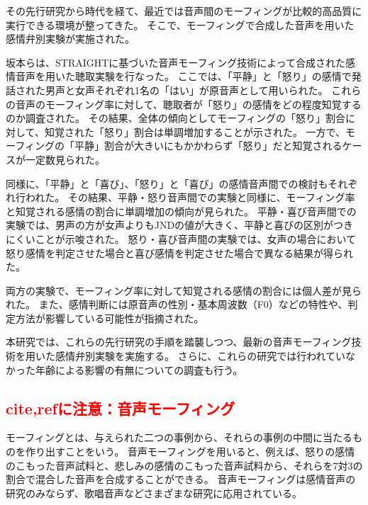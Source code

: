その先行研究\cite{laukka2005categorical}から時代を経て、最近では音声間のモーフィングが比較的高品質に実行できる環境が整ってきた\cite{matsui2003STRAIGHT,kawahara2024interactive}。
そこで、モーフィングで合成した音声を用いた感情弁別実験が実施された。

坂本らは、STRAIGHTに基づいた音声モーフィング技術\cite{matsui2003STRAIGHT}によって合成された感情音声を用いた聴取実験を行なった\cite{sakamoto2020morphEmo}。
ここでは、「平静」と「怒り」の感情で発話された男声と女声それぞれ1名の「はい」が原音声として用いられた。
これらの音声のモーフィング率に対して、聴取者が「怒り」の感情をどの程度知覚するのか調査された。
その結果、全体の傾向としてモーフィングの「怒り」割合に対して、知覚された「怒り」割合は単調増加することが示された。
一方で、モーフィングの「平静」割合が大きいにもかかわらず「怒り」だと知覚されるケースが一定数見られた。

同様に、「平静」と「喜び」、「怒り」と「喜び」の感情音声間での検討もそれぞれ行われた\cite{sakamoto2021morphEmo}。
その結果、平静・怒り音声間での実験と同様に、モーフィング率と知覚される感情の割合に単調増加の傾向が見られた。
平静・喜び音声間での実験では、男声の方が女声よりもJNDの値が大きく、平静と喜びの区別がつきにくいことが示唆された。
怒り・喜び音声間の実験では、女声の場合において怒り感情を判定させた場合と喜び感情を判定させた場合で異なる結果が得られた。

両方の実験で、モーフィング率に対して知覚される感情の割合には個人差が見られた。
また、感情判断には原音声の性別・基本周波数（F0）などの特性や、判定方法が影響している可能性が指摘された。

本研究では、これらの先行研究の手順を踏襲しつつ、最新の音声モーフィング技術\cite{kawahara2024interactive}を用いた感情弁別実験を実施する。
さらに、これらの研究では行われていなかった年齢による影響の有無についての調査も行う。



\subsection{\textcolor{red}{cite,refに注意：音声モーフィング}}
\label{sec:morphing}
モーフィングとは、与えられた二つの事例から、それらの事例の中間に当たるものを作り出すことをいう。
音声モーフィングを用いると、例えば、怒りの感情のこもった音声試料と、悲しみの感情のこもった音声試料から、それらを7対3の割合で混合した音声を合成することができる。
音声モーフィングは感情音声の研究のみならず、歌唱音声などさまざまな研究に応用されている\cite{kawahara2009tandem}。


